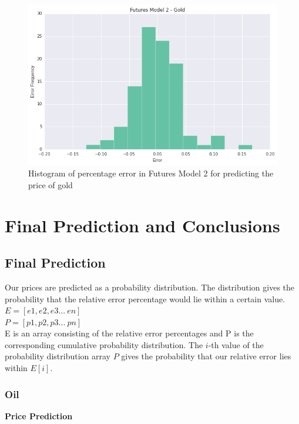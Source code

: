 \documentclass[runningheads]{llncs}
\begin{document}
\begin{figure}
\centering
\includegraphics[width=\textwidth]{futures_gold2.png}
\caption{Histogram of percentage error in Futures Model 2 for predicting the price of gold}
\label{fig:futures_gold2.png}
\end{figure}


\newpage
\section{Final Prediction and Conclusions}
\subsection {Final Prediction}

\noindent Our prices are predicted as a probability distribution. The distribution gives the probability that the relative error percentage would lie within a certain value. \\

\noindent $ E = [e1, e2, e3...\ en]$\\
\noindent $ P = [p1, p2, p3...\ pn]$\\

\noindent E is an array consisting of the relative error percentages and P is the corresponding cumulative probability distribution. The $i$-th value of the probability distribution array $P$ gives the probability that our relative error lies within $E[i]$.

\subsubsection {Oil} \textbf{Price Prediction}\\
\end{document}
